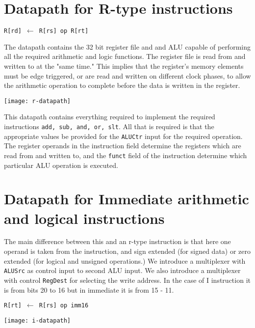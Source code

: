\documentclass[12pt]{report}
\begin{document}
\section{Datapath for R-type instructions}
\begin{center}
\texttt{R[rd] $\longleftarrow$ R[rs] op R[rt] }
\end{center}
The datapath contains the 32 bit register file and and ALU capable
of performing all the required arithmetic and logic functions. The register file is read from and written to at the "same
time." This implies that the register’s memory elements must be
edge triggered, or are read and written on different clock phases, to
allow the arithmetic operation to complete before the data is written
in the register.
\begin{center}
		\texttt{[image: r-datapath]}%
					\label{fig:r-datapath}%
	\end{center}
	This datapath contains everything required to implement the required
instructions \texttt{add, sub, and, or, slt}. All that is required
is that the appropriate values be provided for the \texttt{ALUCtr} input for
the required operation.
The register operands in the instruction field determine the registers
which are read from and written to, and the \texttt{funct} field of the
instruction determine which particular ALU operation is executed.
\newpage
\section{Datapath for Immediate arithmetic and logical instructions}
The main difference between this and an r-type instruction is that
here one operand is taken from the instruction, and sign extended (for
signed data) or zero extended (for logical and unsigned operations.) We introduce a multiplexer with \texttt{ALUSrc} as control input to second ALU input. We also introduce a multiplexer with control \texttt{RegDest} for selecting the write address. In the case of I instruction it is from bits 20 to 16 but in immediate it is from 15 - 11.
\begin{center}
\texttt{R[rt] $\longleftarrow$ R[rs] op imm16}
\end{center}
\begin{center}
		\texttt{[image: i-datapath]}%
					\label{fig:i-datapath}%
	\end{center}
	\newpage
\end{document}
